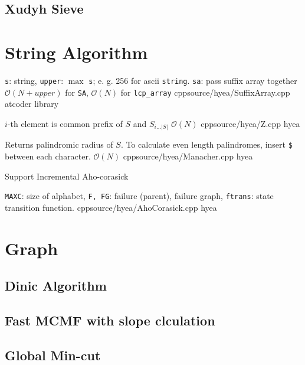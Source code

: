 \documentclass[portrait, 8pt, a4paper, oneside, twocolumn]{extarticle}
\begin{document}
\added

\subsection{Xudyh Sieve}

\added

\section{String Algorithm}

\tested


{\texttt{s}: string, \texttt{upper}: $\max$ \texttt{s}; e. g. 256 for ascii \texttt{string}. \texttt{sa}: pass suffix array together}
{$\mathcal{O}(N+upper)$ for \texttt{SA}, $\mathcal{O}(N)$ for \texttt{lcp\_array}}
{cpp}{source/hyea/SuffixArray.cpp}
{atcoder library}

{$i$-th element is common prefix of $S$ and $S_{i \dots \lvert S \rvert}$}
{$\mathcal{O}(N)$}
{cpp}{source/hyea/Z.cpp}
{hyea}

{Returns palindromic radius of $S$. To calculate even length palindromes, insert \texttt{\$} between each character.}
{$\mathcal{O}(N)$}
{cpp}{source/hyea/Manacher.cpp}
{hyea}


\revised

Support Incremental Aho-corasick

{\texttt{MAXC}: size of alphabet, \texttt{F, FG}: failure (parent), failure graph, \texttt{ftrans}: state transition function.}
{}
{cpp}{source/hyea/AhoCorasick.cpp}
{hyea}

\section {Graph}

\subsection{Dinic Algorithm}
\added

\subsection{Fast MCMF with slope clculation}
\added

\subsection{Global Min-cut}
\added
\end{document}
